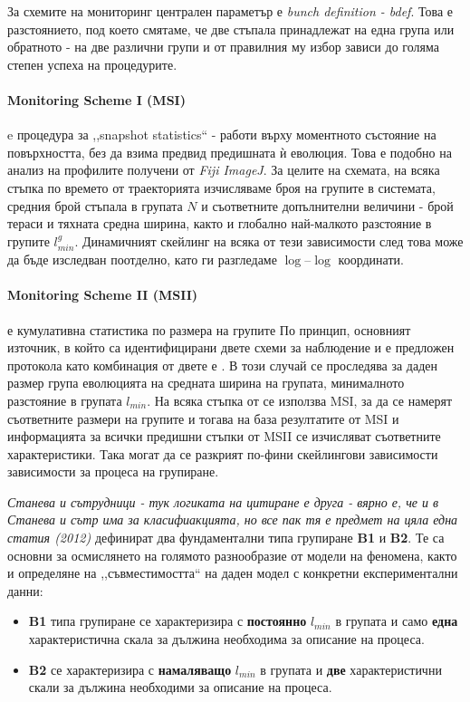За схемите на мониторинг централен параметър е \textit{bunch definition - bdef}. Това е разстоянието, под което смятаме, че две стъпала принадлежат на една група или обратното - на две различни групи и от правилния му избор зависи до голяма степен успеха на процедурите.

\paragraph{Monitoring Scheme I (MSI)} e процедура за ,,snapshot statistics`` \cite{TonchevArxiv2012} - работи върху моментното състояние на повърхността, без да взима предвид предишната ѝ еволюция. Това е подобно на анализ на профилите получени от \textit{Fiji ImageJ}. За целите на схемата, на всяка стъпка по времето от траекторията изчисляваме броя на групите в системата, средния брой стъпала в групата $N$ и съответните допълнителни величини - брой тераси и тяхната средна ширина, както и глобално най-малкото разстояние в групите $l_{min}^g$. Динамичният скейлинг на всяка от тези зависимости след това може да бъде изследван поотделно, като ги разгледаме $\log\mbox{--}\log$ координати.

 \paragraph{Monitoring Scheme II (MSII)} е кумулативна статистика по размера на групите \cite{TonchevArxiv2012} По принцип, основният източник, в който са идентифицирани двете схеми за наблюдение и е предложен протокола като комбинация от двете е \cite{tonchev2010scaling} . В този случай се проследява за даден размер група еволюцията на средната ширина на групата, минималното разстояние в групата $l_{min}$. На всяка стъпка от се използва MSI, за да се намерят съответните размери на групите и тогава на база резултатите от MSI и информацията за всички предишни стъпки от MSII се изчисляват съответните характеристики. Така могат да се разкрият по-фини скейлингови зависимости зависимости за процеса на групиране.

\textit{Станева и сътрудници - тук логиката на цитиране е друга - вярно е, че и в Станева и сътр има за класифиакцията, но все пак тя е предмет на цяла една статия \cite{tonchev2012classification}  (2012)} \cite{Staneva2012} дефинират два фундаментални типа групиране \textbf{B1} и \textbf{B2}. Те са основни за осмислянето на голямото разнообразие от модели на феномена, както и определяне на ,,съвместимостта`` на даден модел с конкретни експериментални данни:
\begin{itemize}
    \item \textbf{B1} типа групиране се характеризира с \textbf{постоянно} $l_{min}$ в групата и само \textbf{една} характеристична скала за дължина необходима за описание на процеса.
    \item \textbf{B2} се характеризира с \textbf{намаляващо} $l_{min}$ в групата и \textbf{две} характеристични скали за дължина необходими за описание на процеса.
\end{itemize}

